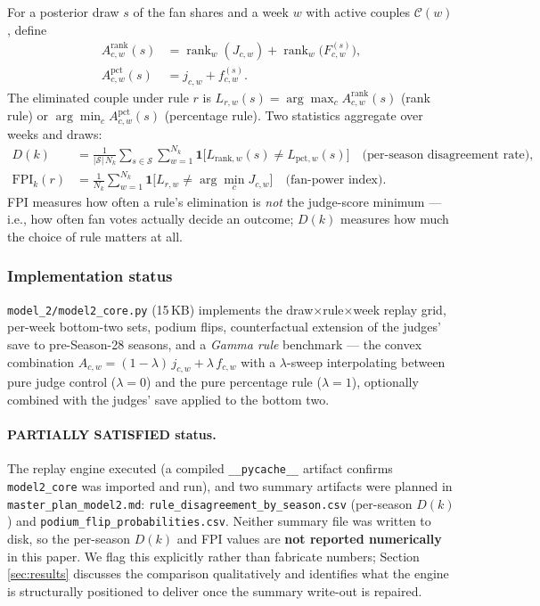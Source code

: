 For a posterior draw $s$ of the fan shares and a week $w$ with active couples
$\mathcal{C}(w)$, define
\begin{align}
A^{\text{rank}}_{c,w}(s) &= \operatorname{rank}_w(J_{c,w}) + \operatorname{rank}_w\big(F^{(s)}_{c,w}\big),\\
A^{\text{pct}}_{c,w}(s) &= j_{c,w} + f^{(s)}_{c,w}.
\end{align}
The eliminated couple under rule $r$ is $L_{r,w}(s) = \arg\max_c A^{\text{rank}}_{c,w}(s)$
(rank rule) or $\arg\min_c A^{\text{pct}}_{c,w}(s)$ (percentage rule). Two statistics
aggregate over weeks and draws:
\begin{align}
D(k) &= \frac{1}{|\mathcal{S}|\,N_k} \sum_{s \in \mathcal{S}} \sum_{w=1}^{N_k}
\mathbf{1}\big[ L_{\text{rank},w}(s) \neq L_{\text{pct},w}(s) \big]
\quad \text{(per-season disagreement rate)},\\
\text{FPI}_k(r) &= \frac{1}{N_k} \sum_{w=1}^{N_k} \mathbf{1}\big[ L_{r,w} \neq
\arg\min_c J_{c,w} \big]
\quad \text{(fan-power index)}.
\end{align}
FPI measures how often a rule's elimination is \emph{not} the judge-score minimum ---
i.e., how often fan votes actually decide an outcome; $D(k)$ measures how much the
choice of rule matters at all.

\subsubsection{Implementation status}

\texttt{model\_2/model2\_core.py} (15\,KB) implements the draw$\times$rule$\times$week
replay grid, per-week bottom-two sets, podium flips, counterfactual extension of the
judges' save to pre-Season-28 seasons, and a \emph{Gamma rule} benchmark --- the convex
combination $A_{c,w} = (1-\lambda)\,j_{c,w} + \lambda\,f_{c,w}$ with a $\lambda$-sweep
interpolating between pure judge control ($\lambda=0$) and the pure percentage rule
($\lambda=1$), optionally combined with the judges' save applied to the bottom two.

\paragraph{PARTIALLY SATISFIED status.} The replay engine executed (a compiled
\texttt{\_\_pycache\_\_} artifact confirms \texttt{model2\_core} was imported and run),
and two summary artifacts were planned in \texttt{master\_plan\_model2.md}:
\texttt{rule\_disagreement\_by\_season.csv} (per-season $D(k)$) and
\texttt{podium\_flip\_probabilities.csv}. Neither summary file was written to disk, so
the per-season $D(k)$ and FPI values are \textbf{not reported numerically} in this
paper. We flag this explicitly rather than fabricate numbers; Section
\ref{sec:results} discusses the comparison qualitatively and identifies what the engine
is structurally positioned to deliver once the summary write-out is repaired.

